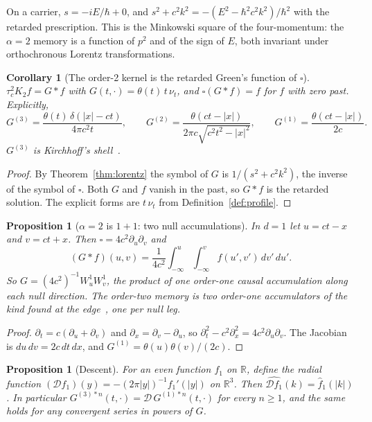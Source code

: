 \documentclass[11pt]{amsart}
\newtheorem{proposition}[theorem]{Proposition}
\newtheorem{corollary}[theorem]{Corollary}
\theoremstyle{definition}
\theoremstyle{remark}
\newcommand{\Desc}{\mathcal D}
\begin{document}
On a carrier, $s=-iE/\hbar+0$, and $s^2+c^2k^2=-(E^2-\hbar^2c^2k^2)/\hbar^2$ with the retarded prescription. This is the Minkowski square of the four-momentum: the $\alpha=2$ memory is a function of $p^2$ and of the sign of $E$, both invariant under orthochronous Lorentz transformations.

\begin{corollary}[The order-2 kernel is the retarded Green's function of $\square$]\label{cor:green}
$\tau_c^2K_2f=G*f$ with $G(t,\cdot)=\theta(t)\,t\,\nu_t$, and $\square(G*f)=f$ for $f$ with zero past. Explicitly,
\[
G^{(3)}=\frac{\theta(t)\,\delta(\lvert x\rvert-ct)}{4\pi c^2t},\qquad
G^{(2)}=\frac{\theta(ct-\lvert x\rvert)}{2\pi c\sqrt{c^2t^2-\lvert x\rvert^2}},\qquad
G^{(1)}=\frac{\theta(ct-\lvert x\rvert)}{2c}.
\]
$G^{(3)}$ is Kirchhoff's shell~\cite{CH}.
\end{corollary}

\begin{proof}
By Theorem~\ref{thm:lorentz} the symbol of $G$ is $1/(s^2+c^2k^2)$, the inverse of the symbol of $\square$. Both $G$ and $f$ vanish in the past, so $G*f$ is the retarded solution. The explicit forms are $t\,\nu_t$ from Definition~\ref{def:profile}.
\end{proof}

\begin{proposition}[$\alpha=2$ is $1+1$: two null accumulations]\label{prop:nulllegs}
In $d=1$ let $u=ct-x$ and $v=ct+x$. Then $\square=4c^2\partial_u\partial_v$ and
\[
(G*f)(u,v)=\frac1{4c^2}\int_{-\infty}^{u}\!\!\int_{-\infty}^{v}f(u',v')\,dv'\,du' .
\]
So $G=(4c^2)^{-1}W^1_uW^1_v$, the product of one order-one causal accumulation along each null direction. The order-two memory is two order-one accumulators of the kind found at the edge~\cite[Prop.~6.1]{Edge}, one per null leg.
\end{proposition}

\begin{proof}
$\partial_t=c(\partial_u+\partial_v)$ and $\partial_x=\partial_v-\partial_u$, so $\partial_t^2-c^2\partial_x^2=4c^2\partial_u\partial_v$. The Jacobian is $du\,dv=2c\,dt\,dx$, and $G^{(1)}=\theta(u)\theta(v)/(2c)$.
\end{proof}

\begin{proposition}[Descent]\label{prop:descent}
For an even function $f_1$ on $\mathbb R$, define the radial function $(\Desc f_1)(y)=-(2\pi\lvert y\rvert)^{-1}f_1'(\lvert y\rvert)$ on $\mathbb R^3$. Then $\widehat{\Desc f_1}(k)=\hat f_1(\lvert k\rvert)$. In particular $G^{(3)*n}(t,\cdot)=\Desc\,G^{(1)*n}(t,\cdot)$ for every $n\ge1$, and the same holds for any convergent series in powers of $G$.
\end{proposition}
\end{document}

